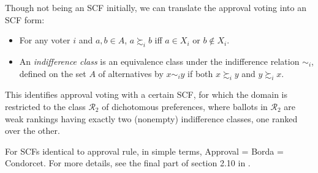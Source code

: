 Though not being an SCF initially, we can translate the approval voting into an SCF form:

\begin{definition}
    \begin{itemize}
        \item For any voter $i$ and $a,b \in A$, $a \succsim_i b$ iff $a \in X_i$ or $b \not \in X_i$. 
        \item An \emph{indifference class} is an equivalence class under the indifference relation $\sim_i$, defined on the set $A$ of alternatives by $x \sim_i y$ if both $x \succsim_i y$ and $y \succsim_i x$.
    \end{itemize}
\end{definition}

This identifies approval voting with a certain SCF, for which the domain is restricted to the class $\mathcal{R}_2$ of dichotomous preferences, where ballots in $\mathcal{R}_2$ are weak rankings having exactly two (nonempty) indifference classes, one ranked over the other. 

For SCFs identical to approval rule, in simple terms, Approval = Borda = Condorcet. For more details, see the final part of section 2.10 in \textcite{moulinHandbookComputationalSocial2016}.